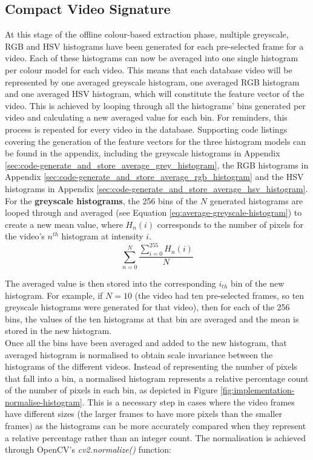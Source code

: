 
\subsection{Compact Video Signature}
\label{sec:implementation-compact-video-signature}

At this stage of the offline colour-based extraction phase, multiple greyscale, RGB and HSV histograms have been generated for each pre-selected frame for a video. Each of these histograms can now be averaged into one single histogram per colour model for each video. This means that each database video will be represented by one averaged greyscale histogram, one averaged RGB histogram and one averaged HSV histogram, which will constitute the feature vector of the video. This is achieved by looping through all the histograms' bins generated per video and calculating a new averaged value for each bin. For reminders, this process is repeated for every video in the database. Supporting code listings covering the generation of the feature vectors for the three histogram models can be found in the appendix, including the greyscale histograms in Appendix \ref{sec:code-generate_and_store_average_grey_histogram}, the RGB histograms in Appendix \ref{sec:code-generate_and_store_average_rgb_histogram} and the HSV histograms in Appendix \ref{sec:code-generate_and_store_average_hsv_histogram}.\\

For the \textbf{greyscale histograms}, the 256 bins of the $N$ generated histograms are looped through and averaged (see Equation \ref{eq:average-greyscale-histogram}) to create a new mean value, where $H_n(i)$ corresponds to the number of pixels for the video's $n^{th}$ histogram at intensity $i$.
\begin{equation}
\label{eq:average-greyscale-histogram}
    \sum_{n=0}^{N} \frac{\sum_{i=0}^{255} H_n(i)}{N}
\end{equation}

The averaged value is then stored into the corresponding $i_{th}$ bin of the new histogram. For example, if $N=10$ (the video had ten pre-selected frames, so ten greyscale histograms were generated for that video), then for each of the 256 bins, the values of the ten histograms at that bin are averaged and the mean is stored in the new histogram.\\

Once all the bins have been averaged and added to the new histogram, that averaged histogram is normalised to obtain scale invariance between the histograms of the different videos. Instead of representing the number of pixels that fall into a bin, a normalised histogram represents a relative percentage count of the number of pixels in each bin, as depicted in Figure \ref{fig:implementation-normalise-histogram}. This is a necessary step in cases where the video frames have different sizes (the larger frames to have more pixels than the smaller frames) as the histograms can be more accurately compared when they represent a relative percentage rather than an integer count. The normalisation is achieved through OpenCV's \textit{cv2.normalize()} function:


